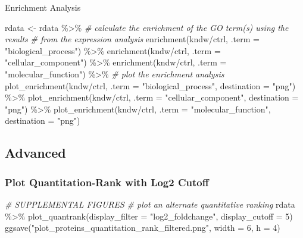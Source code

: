 \documentclass[
]{book}
\newenvironment{Shaded}{\begin{snugshade}}{\end{snugshade}}
\newcommand{\AttributeTok}[1]{\textcolor[rgb]{0.77,0.63,0.00}{#1}}
\newcommand{\CommentTok}[1]{\textcolor[rgb]{0.56,0.35,0.01}{\textit{#1}}}
\newcommand{\DecValTok}[1]{\textcolor[rgb]{0.00,0.00,0.81}{#1}}
\newcommand{\FunctionTok}[1]{\textcolor[rgb]{0.00,0.00,0.00}{#1}}
\newcommand{\NormalTok}[1]{#1}
\newcommand{\OtherTok}[1]{\textcolor[rgb]{0.56,0.35,0.01}{#1}}
\newcommand{\SpecialCharTok}[1]{\textcolor[rgb]{0.00,0.00,0.00}{#1}}
\newcommand{\StringTok}[1]{\textcolor[rgb]{0.31,0.60,0.02}{#1}}
\begin{document}
Enrichment Analysis

\begin{Shaded}
\begin{Highlighting}[]
\NormalTok{rdata }\OtherTok{\textless{}{-}}\NormalTok{ rdata }\SpecialCharTok{\%\textgreater{}\%}
  \CommentTok{\# calculate the enrichment of the GO term(s) using the results}
  \CommentTok{\# from the expression analysis}
  \FunctionTok{enrichment}\NormalTok{(kndw}\SpecialCharTok{/}\NormalTok{ctrl, }\AttributeTok{.term =} \StringTok{"biological\_process"}\NormalTok{) }\SpecialCharTok{\%\textgreater{}\%}
  \FunctionTok{enrichment}\NormalTok{(kndw}\SpecialCharTok{/}\NormalTok{ctrl, }\AttributeTok{.term =} \StringTok{"cellular\_component"}\NormalTok{) }\SpecialCharTok{\%\textgreater{}\%}
  \FunctionTok{enrichment}\NormalTok{(kndw}\SpecialCharTok{/}\NormalTok{ctrl, }\AttributeTok{.term =} \StringTok{"molecular\_function"}\NormalTok{) }\SpecialCharTok{\%\textgreater{}\%}
  \CommentTok{\# plot the enrichment analysis}
  \FunctionTok{plot\_enrichment}\NormalTok{(kndw}\SpecialCharTok{/}\NormalTok{ctrl, }\AttributeTok{.term =} \StringTok{"biological\_process"}\NormalTok{, }\AttributeTok{destination =} \StringTok{"png"}\NormalTok{) }\SpecialCharTok{\%\textgreater{}\%}
  \FunctionTok{plot\_enrichment}\NormalTok{(kndw}\SpecialCharTok{/}\NormalTok{ctrl, }\AttributeTok{.term =} \StringTok{"cellular\_component"}\NormalTok{, }\AttributeTok{destination =} \StringTok{"png"}\NormalTok{) }\SpecialCharTok{\%\textgreater{}\%}
  \FunctionTok{plot\_enrichment}\NormalTok{(kndw}\SpecialCharTok{/}\NormalTok{ctrl, }\AttributeTok{.term =} \StringTok{"molecular\_function"}\NormalTok{, }\AttributeTok{destination =} \StringTok{"png"}\NormalTok{) }
\end{Highlighting}
\end{Shaded}

\hypertarget{advanced}{%
\subsection{Advanced}\label{advanced}}

\hypertarget{plot-quantitation-rank-with-log2-cutoff}{%
\subsubsection{Plot Quantitation-Rank with Log2 Cutoff}\label{plot-quantitation-rank-with-log2-cutoff}}

\begin{Shaded}
\begin{Highlighting}[]
\CommentTok{\# SUPPLEMENTAL FIGURES}
\CommentTok{\# plot an alternate quantitative ranking}
\NormalTok{rdata }\SpecialCharTok{\%\textgreater{}\%}
  \FunctionTok{plot\_quantrank}\NormalTok{(}\AttributeTok{display\_filter =} \StringTok{"log2\_foldchange"}\NormalTok{,}
                 \AttributeTok{display\_cutoff =} \DecValTok{5}\NormalTok{)}
\FunctionTok{ggsave}\NormalTok{(}\StringTok{"plot\_proteins\_quantitation\_rank\_filtered.png"}\NormalTok{,}
       \AttributeTok{width =} \DecValTok{6}\NormalTok{, }\AttributeTok{h =} \DecValTok{4}\NormalTok{)}
\end{Highlighting}
\end{Shaded}
\end{document}
